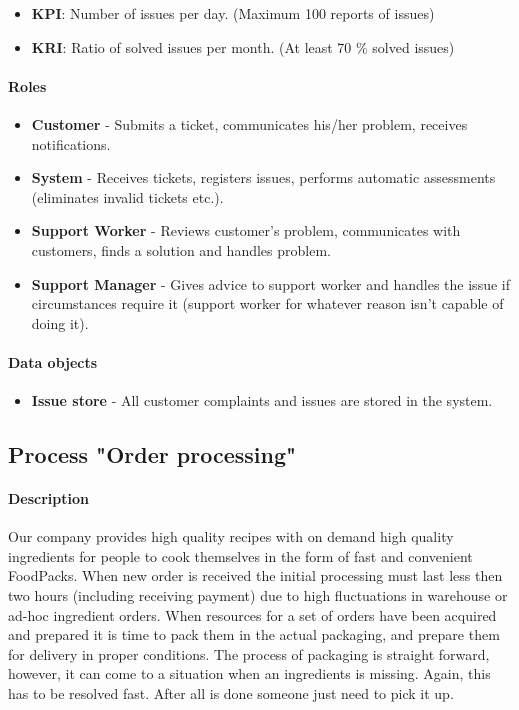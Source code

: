 \documentclass[11pt,a4paper]{article}
\begin{document}
\begin{itemize}
    \item \textbf{KPI}: Number of issues per day. (Maximum 100 reports of issues)
    \item \textbf{KRI}: Ratio of solved issues per month. (At least 70 \% solved issues)
\end{itemize}

\paragraph{Roles}

\begin{itemize}
    \item \textbf{Customer} - Submits a ticket, communicates his/her problem, receives notifications.
    \item \textbf{System} - Receives tickets, registers issues, performs automatic assessments (eliminates invalid tickets etc.).
    \item \textbf{Support Worker} - Reviews customer's problem, communicates with customers, finds a solution and handles problem.
    \item \textbf{Support Manager} - Gives advice to support worker and handles the issue if circumstances require it (support worker for whatever reason isn't capable of doing it).
\end{itemize}

\paragraph{Data objects}

\begin{itemize}
    \item \textbf{Issue store} - All customer complaints and issues are stored in the system.
\end{itemize}

\newpage




\subsection{Process "Order processing"}

\paragraph{Description}
Our company provides high quality recipes with on demand high quality ingredients for people to cook themselves in the form of fast and convenient FoodPacks. When new order is received the initial processing must last less then two hours (including receiving payment) due to high fluctuations in warehouse or ad-hoc ingredient orders. When resources for a set of orders have been acquired and prepared it is time to pack them in the actual packaging, and prepare them for delivery in proper conditions. The process of packaging is straight forward, however, it can come to a situation when an ingredients is missing. Again, this has to be resolved fast. After all is done someone just need to pick it up.
\end{document}
